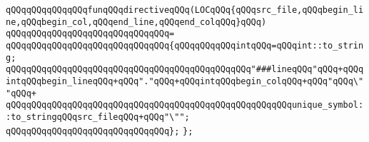 \verb|qQQqqQQqqQQqqQQqfunqQQqdirectiveqQQq(LOCqQQq{qQQqsrc_file,qQQqbegin_line,qQQqbegin_col,qQQqend_line,qQQqend_colqQQq}qQQq)|\newline
\verb|qQQqqQQqqQQqqQQqqQQqqQQqqQQqqQQq=|\newline
\verb|qQQqqQQqqQQqqQQqqQQqqQQqqQQqqQQq{qQQqqQQqqQQqintqQQq=qQQqint::to_string;|\newline
\newline
\verb|qQQqqQQqqQQqqQQqqQQqqQQqqQQqqQQqqQQqqQQqqQQqqQQq"###lineqQQq"qQQq+qQQqintqQQqbegin_lineqQQq+qQQq"."qQQq+qQQqintqQQqbegin_colqQQq+qQQq"qQQq\""qQQq+|\newline
\verb|qQQqqQQqqQQqqQQqqQQqqQQqqQQqqQQqqQQqqQQqqQQqqQQqqQQqqQQqunique_symbol::to_stringqQQqsrc_fileqQQq+qQQq"\"";|\newline
\verb|qQQqqQQqqQQqqQQqqQQqqQQqqQQqqQQq};|\newline
\verb|};|\newline
\newline
\newline


